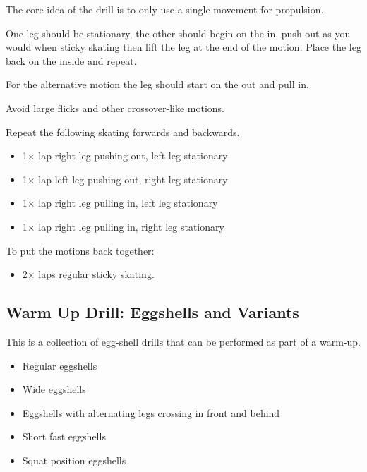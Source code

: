 The core idea of the drill is to only use a single movement for propulsion.  

One leg should be stationary, the other should begin on the in, push out as you would when sticky skating then lift the leg at the end of the motion.  
Place the leg back on the inside and repeat. 

For the alternative motion the leg should start on the out and pull in.   

Avoid large flicks and other crossover-like motions.    

Repeat the following skating forwards and backwards. 
\begin{itemize}
    \item 1$\times$ lap right leg pushing out, left leg stationary  
    \item 1$\times$ lap left leg pushing out, right leg stationary 
    \item 1$\times$ lap right leg pulling in, left leg stationary 
    \item 1$\times$ lap right leg pulling in, right leg stationary 
\end{itemize}

To put the motions back together:
\begin{itemize}
    \item 2$\times$ laps regular sticky skating. 
\end{itemize}


\subsection*{Warm Up Drill: Eggshells and Variants}

This is a collection of egg-shell drills that can be performed as part of a warm-up. 

\begin{itemize}
    \item Regular eggshells  
    \item Wide eggshells
    \item Eggshells with alternating legs crossing in front and behind 
    \item Short fast eggshells 
    \item Squat position eggshells
\end{itemize}
